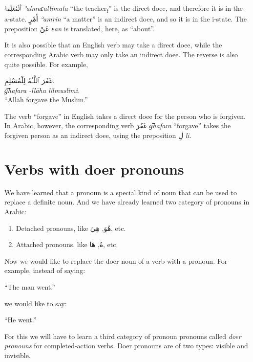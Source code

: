 \documentclass[
  10pt,
]{book}
\providecommand{\tightlist}{%
  \setlength{\itemsep}{0pt}\setlength{\parskip}{0pt}}
\begin{document}
\foreignlanguage{arabic}{ٱَلْمُعَلِّمَةَ} \emph{ʾalmuɛallimata} \enquote{the teacher\textsubscript{f}} is the direct doee, and therefore it is in the a-state.
\foreignlanguage{arabic}{أَمْرٍ} \emph{ʾamrin} \enquote{a matter} is an indirect doee, and so it is in the i-state.
The preposition \foreignlanguage{arabic}{عَنْ} \emph{ɛan} is translated, here, as \enquote{about}.

It is also possible that an English verb may take a direct doee, while the corresponding Arabic verb may only take an indirect doee. The reverse is also quite possible. For example,

\foreignlanguage{arabic}{غَفَرَ ٱللَّـٰهُ لِلْمُسْلِمِ.}\\
\emph{g͡hafara -llāhu lilmuslimi.}\\
\enquote{Allāh forgave the Muslim.}

The verb \enquote{forgave} in English takes a direct doee for the person who is forgiven. In Arabic, however, the corresponding verb \foreignlanguage{arabic}{غَفَرَ} \emph{g͡hafara} \enquote{forgave} takes the forgiven person as an indirect doee, using the preposition \foreignlanguage{arabic}{لِ} \emph{li}.

\section{Verbs with doer pronouns}\label{verbs-with-doer-pronouns}

We have learned that a pronoun is a special kind of noun that can be used to replace a definite noun. And we have already learned two category of pronouns in Arabic:

\begin{enumerate}
\def\labelenumi{\roman{enumi}.}
\tightlist
\item
  Detached pronouns, like \foreignlanguage{arabic}{هُوَ}, \foreignlanguage{arabic}{هِيَ}, etc.
\item
  Attached pronouns, like \foreignlanguage{arabic}{هُ}, \foreignlanguage{arabic}{هَا}, etc.
\end{enumerate}

Now we would like to replace the doer noun of a verb with a pronoun. For example, instead of saying:

\enquote{The man went.}

we would like to say:

\enquote{He went.}

For this we will have to learn a third category of pronoun pronouns called \emph{doer pronouns} for completed-action verbs.
Doer pronouns are of two types: visible and invisible.
\end{document}
